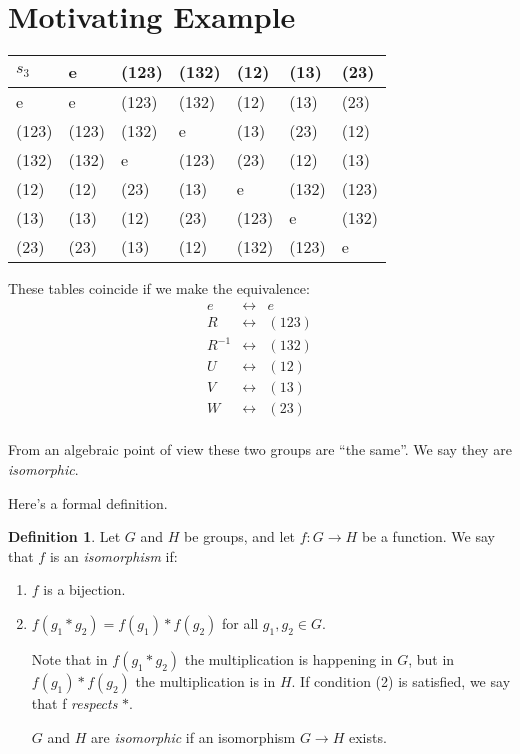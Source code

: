 \documentclass{article}
\theoremstyle{definition}
\newtheorem{definition}{Definition}[section]
\begin{document}
\section{Motivating Example}

\begin{table}[h]
\centering
\begin{tabular}{l|llllll}
$s_3$  & e     & (123) & (132) & (12)  & (13)  & (23)  \\
\hline
e     & e     & (123) & (132) & (12)  & (13)  & (23)   \\
(123) & (123) & (132) & e     & (13)  & (23)  & (12)   \\
(132) & (132) & e     & (123) & (23)  & (12)  & (13)   \\
(12)  & (12)  & (23)  & (13)  & e     & (132) & (123)  \\
(13)  & (13)  & (12)  & (23)  & (123) & e     & (132)  \\
(23)  & (23)  & (13)  & (12)  & (132) & (123) & e      \\
\end{tabular}
\end{table}

These tables coincide if we make the equivalence:
$$ 
\begin{matrix}
  e & \leftrightarrow & e \\
  R & \leftrightarrow & (123) \\
  R^{-1} & \leftrightarrow & (132) \\
  U & \leftrightarrow & (12) \\
  V & \leftrightarrow & (13) \\
  W & \leftrightarrow & (23) \\
\end{matrix}
$$

From an algebraic point of view these two groups are ``the same''. We say they are \textit{isomorphic}.

Here's a formal definition.\\


\begin{definition}
Let $G$ and $H$ be groups, and let $f : G \rightarrow H$ be a function. We say that $f$ is an \emph{isomorphism} if:
\begin{enumerate}
\item $f$ is a bijection.
\item $f(g_1 * g_2)=f(g_1) * f(g_2) $ for all $g_1, g_2 \in G$.

Note that in $f(g_1 * g_2)$ the multiplication is happening in $G$, but in $f(g_1) * f(g_2)$ the multiplication is in $H$. If condition (2) is satisfied, we say that f \emph{respects} $*$.

$G$ and $H$ are \emph{isomorphic} if an isomorphism $G \rightarrow H$ exists.
\end{enumerate}
\end{definition}
\end{document}
